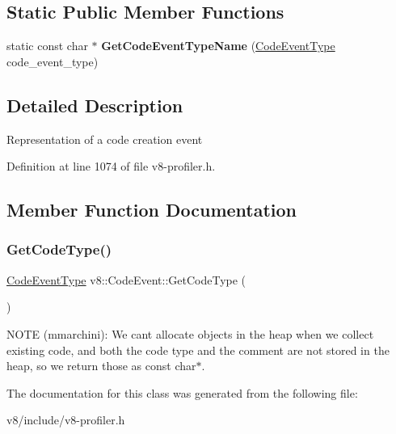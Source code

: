 \subsection*{Static Public Member Functions}
\begin{DoxyCompactItemize}
\item 
\mbox{\label{classv8_1_1CodeEvent_a9eb6284bf0b4031536f175f87a7b4cbf}} 
static const char $\ast$ {\bfseries Get\+Code\+Event\+Type\+Name} (\mbox{\hyperlink{namespacev8_af0ff31131cc32ced9b5279b321569bbc}{Code\+Event\+Type}} code\+\_\+event\+\_\+type)
\end{DoxyCompactItemize}


\subsection{Detailed Description}
Representation of a code creation event 

Definition at line 1074 of file v8-\/profiler.\+h.



\subsection{Member Function Documentation}
\mbox{\label{classv8_1_1CodeEvent_a3a6507024df2e1e0898c03bc35bbd293}} 
\subsubsection{\texorpdfstring{Get\+Code\+Type()}{GetCodeType()}}
{\footnotesize\ttfamily \mbox{\hyperlink{namespacev8_af0ff31131cc32ced9b5279b321569bbc}{Code\+Event\+Type}} v8\+::\+Code\+Event\+::\+Get\+Code\+Type (\begin{DoxyParamCaption}{ }\end{DoxyParamCaption})}

N\+O\+TE (mmarchini)\+: We can\textquotesingle{}t allocate objects in the heap when we collect existing code, and both the code type and the comment are not stored in the heap, so we return those as const char$\ast$. 

The documentation for this class was generated from the following file\+:\begin{DoxyCompactItemize}
\item 
v8/include/v8-\/profiler.\+h\end{DoxyCompactItemize}
